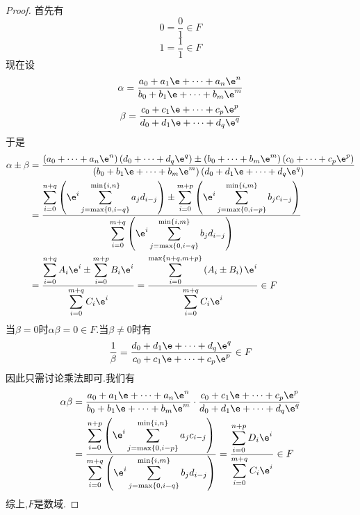 \documentclass{ctexart}
\begin{document}
\begin{proof}
    首先有
    \[0=\dfrac{0}{1}\in F\]
    \[1=\dfrac{1}{1}\in F\]
    现在设
    \[\alpha=\dfrac{a_0+a_1\e+\cdots+a_n\e^n}{b_0+b_1\e+\cdots+b_m\e^m}\]
    \[\beta=\dfrac{c_0+c_1\e+\cdots+c_p\e^p}{d_0+d_1\e+\cdots+d_q\e^q}\]
    于是
    \[\begin{aligned}
        \alpha\pm\beta
        &= \dfrac{\left(a_0+\cdots+a_n\e^n\right)\left(d_0+\cdots+d_q\e^q\right)\pm\left(b_0+\cdots+b_m\e^m\right)\left(c_0+\cdots+c_p\e^p\right)}{\left(b_0+b_1\e+\cdots+b_m\e^m\right)\left(d_0+d_1\e+\cdots+d_q\e^q\right)} \\
        &= \dfrac{\displaystyle\sum_{i=0}^{n+q}\left(\e^{i}\sum_{j=\max\{0,i-q\}}^{\min\{i,n\}}a_jd_{i-j}\right)\pm\sum_{i=0}^{m+p}\left(\e^{i}\sum_{j=\max\{0,i-p\}}^{\min\{i,m\}}b_jc_{i-j}\right)}{\displaystyle\sum_{i=0}^{m+q}\left(\e^{i}\sum_{j=\max\{0,i-q\}}^{\min\{i,m\}}b_jd_{i-j}\right)}\\
        &= \dfrac{\displaystyle\sum_{i=0}^{n+q}A_i\e^i\pm\sum_{i=0}^{m+p}B_i\e^i}{\displaystyle\sum_{i=0}^{m+q}C_i\e^i}
        = \dfrac{\displaystyle\sum_{i=0}^{\max\{n+q,m+p\}}\left(A_i\pm B_i\right)\e^i}{\displaystyle\sum_{i=0}^{m+q}C_i\e^i}\in F
    \end{aligned}\]
    当$\beta=0$时$\alpha\beta=0\in F$.当$\beta\neq0$时有
    \[\dfrac{1}{\beta}=\dfrac{d_0+d_1\e+\cdots+d_q\e^q}{c_0+c_1\e+\cdots+c_p\e^p}\in F\]
    因此只需讨论乘法即可.我们有
    \[\begin{aligned}
        \alpha\beta
        &= \dfrac{a_0+a_1\e+\cdots+a_n\e^n}{b_0+b_1\e+\cdots+b_m\e^m}\cdot\dfrac{c_0+c_1\e+\cdots+c_p\e^p}{d_0+d_1\e+\cdots+d_q\e^q} \\
        &= \dfrac{\displaystyle\sum_{i=0}^{n+p}\left(\e^{i}\sum_{j=\max\{0,i-p\}}^{\min\{i,n\}}a_jc_{i-j}\right)}{\displaystyle\sum_{i=0}^{m+q}\left(\e^{i}\sum_{j=\max\{0,i-q\}}^{\min\{i,m\}}b_jd_{i-j}\right)}
        =\dfrac{\displaystyle\sum_{i=0}^{n+p}D_i\e^i}{\displaystyle\sum_{i=0}^{m+q}C_i\e^i}\in F
    \end{aligned}\]
    综上,$F$是数域.
\end{proof}
\end{document}
